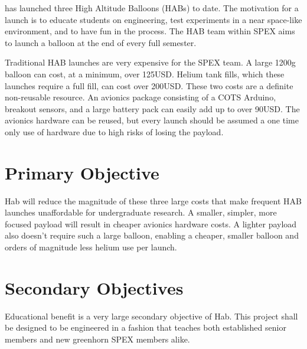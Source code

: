 \documentclass[conference]{IEEEtran} %
\begin{document}
 has launched three High Altitude Balloons (HABs) to date.  The
motivation for a launch is to educate students on engineering, test experiments in
a near space-like environment, and to have fun in the process. The HAB team within SPEX aims to
launch a balloon at the end of every full semester.

Traditional HAB launches are very expensive for the SPEX team.
A large 1200g balloon can cost, at a minimum, over 125USD.  Helium tank fills,
which these launches require a full fill, can cost over 200USD. These two costs
are a definite non-reusable resource. An avionics package consisting of a COTS
Arduino, breakout sensors, and a large battery pack can easily add up to over
90USD. The avionics hardware can be reused, but every launch should be assumed a
one time only use of hardware due to high risks of losing the payload.


\section{Primary Objective}
\label{sec:primary-obj}
\textmu{}Hab will reduce the magnitude of these three large costs that make frequent HAB
launches unaffordable for undergraduate research. A smaller, simpler, more
focused payload will result in cheaper avionics hardware costs. A lighter
payload also doesn't require such a large balloon, enabling a cheaper, smaller
balloon and orders of magnitude less helium use per launch.

\section{Secondary Objectives}
\label{sec:secondary-obj}
Educational benefit is a very large secondary objective of \textmu{}Hab.  This
project shall be designed to be engineered in a fashion that teaches both
established senior members and new greenhorn SPEX members alike.
\end{document}
